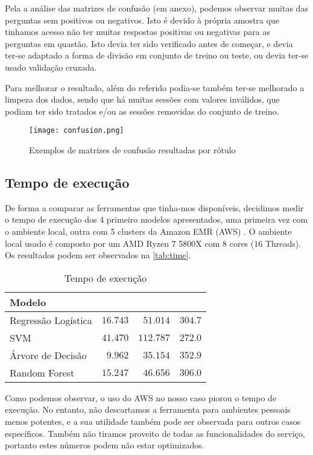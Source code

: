 \documentclass[justified, 11pt]{scrartcl}
\begin{document}
  Pela a análise das matrizes de confusão (em anexo), podemos observar muitas das perguntas sem positivos ou negativos. Isto é devido à própria amostra que tinhamos acesso não ter muitas respostas positivas ou negativas para as perguntas em quastão. Isto devia ter sido verificado antes de começar, e devia ter-se adaptado a forma de divisão em conjunto de treino ou teste, ou devia ter-se usado validação cruzada.

  Para melhorar o resultado, além do referido podia-se também ter-se melhorado a limpeza dos dados, sendo que há muitas sessões com valores inválidos, que podiam ter sido tratados e/ou as sessões removidas do conjunto de treino.

  \begin{figure}[H]
    \centering
    \texttt{[image: confusion.png]}
    \caption{Exemplos de matrizes de confusão resultadas por rótulo}
    \label{fig:confusion_matrix}
  \end{figure}

  \subsection{Tempo de execução}
  De forma a comparar as ferramentas que tinha-mos disponíveis, decidimos medir o tempo de execução dos 4 primeiro modelos apresentados, uma primeira vez com o ambiente local, outra com 5 clusters da Amazon EMR (AWS) . O ambiente local usado é composto por um AMD Ryzen 7 5800X com 8 cores (16 Threads). Os resultados podem ser observados na  \autoref{tab:time}.
  \begin{table}[H]
    \centering
    \caption{Tempo de execução}
    \setlength{\extrarowheight}{0pt}
    \begin{tabulary}{\textwidth}{ L|r r r }
      Modelo &  &   &  \\ \hline
      Regressão Logística & $16.743$ & $51.014$ & $304.7$\\
      SVM & $41.470$ & $112.787$ & $272.0$  \\
      Árvore de Decisão & $9.962$ & $35.154$ & $352.9$\\
      Random Forest & $15.247$ & $46.656$ & $306.0$\\
    \end{tabulary}
    \label{tab:time}
  \end{table}

  Como podemos observar, o uso do AWS no nosso caso piorou o tempo de execução. No entanto, não descartamos a ferramenta para ambientes pessoais menos potentes, e a sua utilidade também pode ser observada para outros casos específicos. Também não tiramos proveito de todas as funcionalidades do serviço, portanto estes números podem não estar optimizados.
\end{document}
